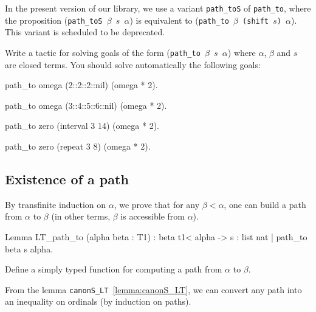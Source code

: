 \begin{remark}
In the present version of our library, we use a variant \texttt{path\_toS} of
\texttt{path\_to}, where the proposition
(\texttt{path\_toS $\beta$ $s$ $\alpha$}) is equivalent to
(\texttt{path\_to $\beta$ (shift $s$) $\alpha$}). This variant is scheduled to be deprecated.
\end{remark}


\begin{exercise}
Write a tactic for solving goals of the form (\texttt{path\_to $\beta$ $s$ $\alpha$})
where $\alpha$, $\beta$ and $s$ are closed terms. 
You should solve automatically the following goals:

\begin{Coqsrc}
 path_to omega (2::2::2::nil) (omega * 2).

 path_to omega (3::4::5::6::nil) (omega * 2).

 path_to zero (interval 3 14) (omega * 2).

 path_to zero (repeat 3 8) (omega * 2).
\end{Coqsrc}

\end{exercise}



\subsection{Existence of a path}


By transfinite induction on $\alpha$, we prove that for any $\beta<\alpha$, 
one can build a path from $\alpha$ to $\beta$ (in other terms, $\beta$ is accessible from $\alpha$).

\begin{Coqsrc}
Lemma LT_path_to (alpha beta : T1) :
  beta t1< alpha -> {s : list nat | path_to beta s alpha}.
\end{Coqsrc}


\begin{exercise}
Define a simply typed function for computing a path from $\alpha$ to $\beta$.
\end{exercise}


\noindent 
From the lemma \texttt{canonS\_LT}~\vref{lemma:canonS_LT}, we can convert any path into an inequality on ordinals (by induction on paths).


